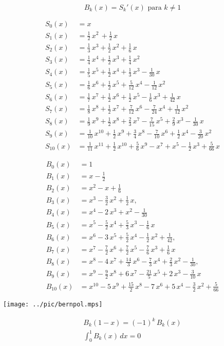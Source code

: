 \documentclass{article}
\begin{document}
\vspace{2em}

\[ B_k (x) = S_k' (x) \text{ para }k\ne 1 \]

\pagebreak

\begin{minipage}[t]{0.5\textwidth}\small
\begin{align*}
S_0 (x) & = x\\
S_1 (x) & = \frac{1}{2}\,x^2\,+\frac{1}{2}\,x\\
S_2 (x) & = \frac{1}{3}\,x^3+\frac{1}{2}\,x^2+\frac{1}{6}\,x\\
S_3 (x) & = \frac{1}{4}\,x^4+\frac{1}{2}\,x^3+\frac{1}{4}\,x^2\\
S_4 (x) & = \frac{1}{5}\,x^5+\frac{1}{2}\,x^4+\frac{1}{3}\,x^3-\frac{1}{30}\,x\\
S_5 (x) & = \frac{1}{6}\,x^6+\frac{1}{2}\,x^5+\frac{5}{12}\,x^4-\frac{1}{12}\,x^2\\
S_6 (x) & = \frac{1}{7}\,x^7+\frac{1}{2}\,x^6+\frac{1}{2}\,x^5-\frac{1}{6}\,x^3+\frac{1}{42}\,x\\
S_7 (x) & = \frac{1}{8}\,x^8+\frac{1}{2}\,x^7+\frac{7}{12}\,x^6-\frac{7}{24}\,x^4+\frac{1}{12}\,x^2\\
S_8 (x) & = \frac{1}{9}\,x^9+\frac{1}{2}\,x^8+\frac{2}{3}\,x^7-\frac{7}{15}\,x^5+\frac{2}{9}\,x^3-\frac{1}{30}\,x\\
S_9 (x) & = \frac{1}{10}\,x^{10}+\frac{1}{2}\,x^9+\frac{3}{4}\,x^8-\frac{7}{10}\,x^6+\frac{1}{2}\,x^4-\frac{3}{20}\,x^2\\
S_{10} (x) & = \frac{1}{11}\,x^{11}+\frac{1}{2}\,x^{10}+\frac{5}{6}\,x^9-x^7+x^5-\frac{1}{2}\,x^3+\frac{5}{66}\,x
\end{align*}
\end{minipage}
\begin{minipage}[t]{0.5\textwidth}\small
\begin{align*}
B_0 (x) & = 1\\
B_1 (x) & = x - \frac{1}{2}\\
B_2 (x) & = x^2 - x + \frac{1}{6}\\
B_3 (x) & = x^3 - \frac{3}{2}\,x^2 + \frac{1}{2}\,x,\\
B_4 (x) & = x^4 - 2\,x^3 + x^2 - \frac{1}{30}\\
B_5 (x) & = x^5 - \frac{5}{2}\,x^4 + \frac{5}{3}\,x^3 - \frac{1}{6}\,x\\
B_6 (x) & = x^6 - 3\,x^5 + \frac{5}{2}\,x^4 - \frac{1}{2}\,x^2 + \frac{1}{42},\\
B_7 (x) & = x^7 - \frac{7}{2}\,x^6 + \frac{7}{2}\,x^5 - \frac{7}{6}\,x^3 + \frac{1}{6}\,x\\
B_8 (x) & = x^8 - 4\,x^7 + \frac{14}{3}\,x^6 - \frac{7}{3}\,x^4 + \frac{2}{3}\,x^2 - \frac{1}{30},\\
B_9 (x) & = x^9 - \frac{9}{2}\,x^8 + 6\,x^7 - \frac{21}{5}\,x^5 + 2\,x^3 - \frac{3}{10}\,x\\
B_{10} (x) & = x^{10} - 5\,x^9 + \frac{15}{2}\,x^8 - 7\,x^6 + 5\,x^4 - \frac{3}{2}\,x^2 + \frac{5}{66}
\end{align*}
\end{minipage}

\vspace{2em}

\begin{center}
\texttt{[image: ../pic/bernpol.mps]}
\end{center}

\begin{gather*}
B_k (1-x) = (-1)^k\,B_k (x)\\
\int_0^1 B_k (x)\,dx = 0
\end{gather*}
\end{document}
